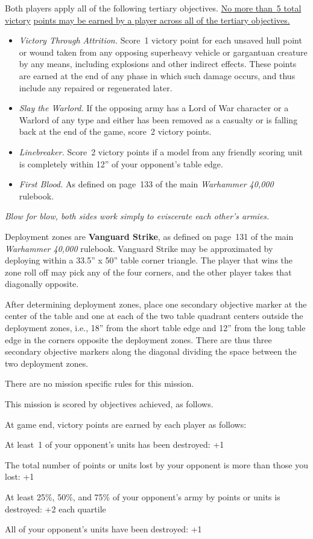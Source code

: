 \documentclass{40k}
\newcommand{\tertiaries}
{%
\missionsubheading{Tertiary Objectives.}  Both players apply all of
the following tertiary objectives.  \underline{No more than~5 total
  victory} \underline{points may be earned by a player across all of
  the tertiary objectives.}

\begin{itemize}
\item \textit{Victory Through Attrition.}  Score~1 victory point for
  each unsaved hull point or wound taken from any opposing superheavy
  vehicle or gargantuan creature by any means, including explosions
  and other indirect effects.  These points are earned at the end of
  any phase in which such damage occurs, and thus include any repaired
  or regenerated later.

\item \textit{Slay the Warlord.}  If the opposing army has a Lord of
  War character or a Warlord of any type and either has been removed
  as a casualty or is falling back at the end of the game, score~2
  victory points.

\item \textit{Linebreaker.}  Score~2 victory points if a model from
  any friendly scoring unit is completely within 12'' of your
  opponent's table edge.

\item \textit{First Blood.}  As defined on page~133 of the main
  \emph{Warhammer 40,000} rulebook.
\end{itemize}
}
\begin{document}
\tertiaries

\clearpage
{}

\centerline{\emph{Blow for blow, both sides work simply to eviscerate
    each other's armies.}}


Deployment zones are \textbf{Vanguard Strike}, as defined on page~131
of the main \emph{Warhammer 40,000} rulebook.  Vanguard Strike may be
approximated by deploying within a 33.5'' x 50'' table corner
triangle.  The player that wins the zone roll off may pick any of the
four corners, and the other player takes that diagonally opposite.

\bigskip%
After determining deployment zones, place one secondary objective
marker at the center of the table and one at each of the two table
quadrant centers outside the deployment zones, i.e., 18'' from the
short table edge and 12'' from the long table edge in the corners
opposite the deployment zones.  There are thus three secondary
objective markers along the diagonal dividing the space between the
two deployment zones.



There are no mission specific rules for this mission.



This mission is scored by objectives achieved, as follows.


At game end, victory points are earned by each player as follows:

\begin{squishitemize}
\item At least~1 of your opponent's units has been destroyed: +1

\item The total number of points or units lost by your opponent is
  more than those you lost: +1

\item At least 25\%, 50\%, and 75\% of your opponent's army by points
  or units is destroyed: +2 each quartile

%
%

\item All of your opponent's units have been destroyed: +1

\end{squishitemize}
\end{document}

